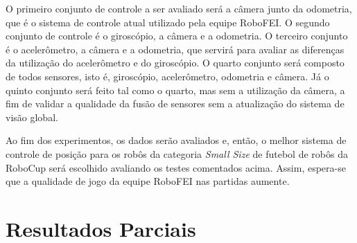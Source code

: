 \documentclass[acronym, symbols]{fei}
\begin{document}
		O primeiro conjunto de controle a ser avaliado será a câmera junto da odometria, que é o sistema de controle atual utilizado pela equipe RoboFEI. O segundo conjunto de controle é o giroscópio, a câmera e a odometria. O terceiro conjunto é o acelerômetro, a câmera e a odometria, que servirá para avaliar as diferenças da utilização do acelerômetro e do giroscópio. O quarto conjunto será composto de todos sensores, isto é, giroscópio, acelerômetro, odometria e câmera. Já o quinto conjunto será feito tal como o quarto, mas sem a utilização da câmera, a fim de validar a qualidade da fusão de sensores sem a atualização do sistema de visão global.
		
		Ao fim dos experimentos, os dados serão avaliados e, então, o melhor sistema de controle de posição para os robôs da categoria \textit{Small Size} de futebol de robôs da RoboCup será escolhido avaliando os testes comentados acima. Assim, espera-se que a qualidade de jogo da equipe RoboFEI nas partidas aumente.
	
\chapter{Resultados Parciais}
	
	\printbibliography
\end{document}
